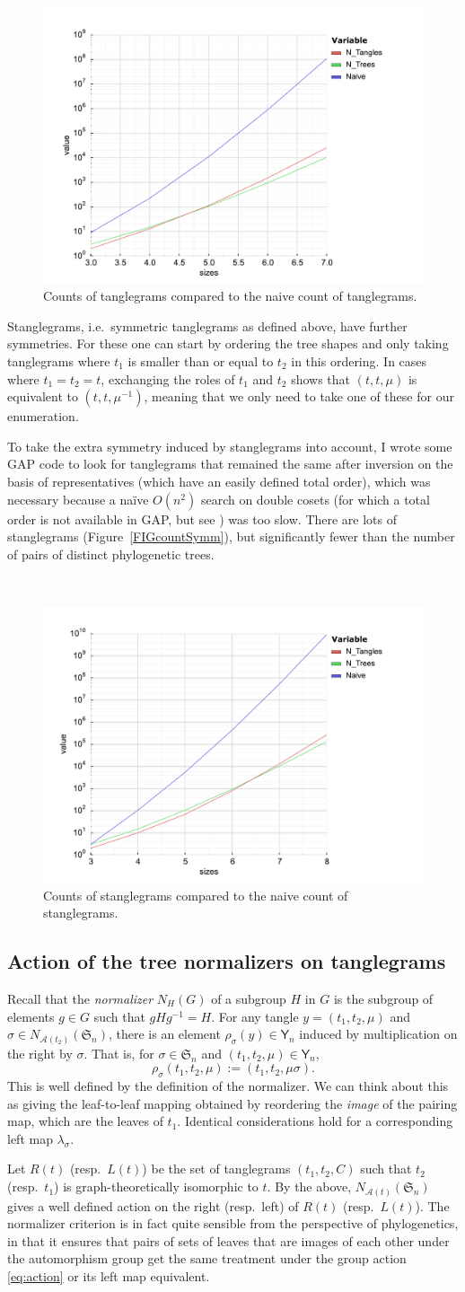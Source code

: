 \documentclass{amsart}
\newcommand{\fS}{\mathfrak S}
\newcommand{\aut}{\mathcal A}
\newcommand{\pairing}{\mu}
\newcommand{\tangle}{\mathsf{Y}}
\newcommand{\arxiv}[1]{#1}
\newcommand{\FIGcountSymm}{\
\label{FIGcountSymm}
\begin{figure}
  \arxiv{\includegraphics[width=.8\linewidth]{figures/symmetric-count}}
  \caption{Counts of stanglegrams compared to the naive count of stanglegrams.}
\end{figure}
}
\newcommand{\FIGcountAsymm}{\
\label{FIGcountAsymm}
\begin{figure}
  \arxiv{\includegraphics[width=.8\linewidth]{figures/asymmetric-count}}
  \caption{Counts of tanglegrams compared to the naive count of tanglegrams.}
\end{figure}
}
\begin{document}
\FIGcountAsymm

Stanglegrams, i.e.\ symmetric tanglegrams as defined above, have further symmetries.
For these one can start by ordering the tree shapes and only taking tanglegrams where $t_1$ is smaller than or equal to $t_2$ in this ordering.
In cases where $t_1 = t_2 = t$, exchanging the roles of $t_1$ and $t_2$ shows that $(t, t, \mu)$ is equivalent to $(t, t, \mu^{-1})$, meaning that we only need to take one of these for our enumeration.

To take the extra symmetry induced by stanglegrams into account, I wrote some GAP code to look for tanglegrams that remained the same after inversion on the basis of representatives (which have an easily defined total order), which was necessary because a na\"ive $O(n^2)$ search on double cosets (for which a total order is not available in GAP, but see \cite{Hulpke2003-em}) was too slow.
There are lots of stanglegrams (Figure~\ref{FIGcountSymm}), but significantly fewer than the number of pairs of distinct phylogenetic trees.

\FIGcountSymm

\subsection{Action of the tree normalizers on tanglegrams}
Recall that the \emph{normalizer} $N_H(G)$ of a subgroup $H$ in $G$ is the subgroup of elements $g \in G$ such that $gHg^{-1} = H$.
For any tangle $y = (t_1, t_2, \pairing)$ and $\sigma \in N_{\aut(t_2)}(\fS_n)$, there is an element $\rho_\sigma(y) \in \tangle_n$ induced by multiplication on the right by $\sigma$.
That is, for $\sigma \in \fS_n$ and $(t_1, t_2, \pairing) \in \tangle_n$,
\begin{equation}
\label{eq:action}
\rho_\sigma (t_1, t_2, \pairing) := (t_1, t_2, \pairing \sigma).
\end{equation}
This is well defined by the definition of the normalizer.
We can think about this as giving the leaf-to-leaf mapping obtained by reordering the \emph{image} of the pairing map, which are the leaves of $t_1$.
Identical considerations hold for a corresponding left map $\lambda_\sigma$.

Let $R(t)$ (resp.\ $L(t)$) be the set of tanglegrams $(t_1, t_2, C)$ such that $t_2$ (resp.\ $t_1$) is graph-theoretically isomorphic to $t$.
By the above, $N_{\aut(t)}(\fS_n)$ gives a well defined action on the right (resp.\ left) of $R(t)$ (resp.\ $L(t)$).
The normalizer criterion is in fact quite sensible from the perspective of phylogenetics, in that it ensures that pairs of sets of leaves that are images of each other under the automorphism group get the same treatment under the group action \eqref{eq:action} or its left map equivalent.
\end{document}
